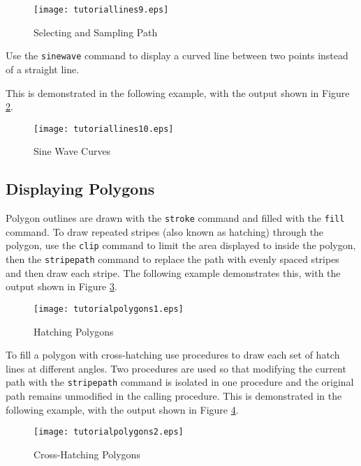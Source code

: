 

\begin{figure}[htb]
\texttt{[image: tutoriallines9.eps]}
\caption{Selecting and Sampling Path}
\label{tutoriallines9}
\end{figure}

Use the \texttt{sinewave} command to display a curved line between
two points instead of a straight line.

This is demonstrated in the following example,
with the output shown in Figure \ref{tutoriallines10}.



\begin{figure}[htb]
\texttt{[image: tutoriallines10.eps]}
\caption{Sine Wave Curves}
\label{tutoriallines10}
\end{figure}

\subsection{Displaying Polygons}

Polygon outlines are drawn with the \texttt{stroke}
command and filled with the \texttt{fill} command.
To draw repeated stripes (also known as hatching) through
the polygon, use the \texttt{clip}
command to limit the area displayed to inside the polygon,
then the \texttt{stripepath}
command to replace the path with evenly spaced stripes and
then draw each stripe.  The following example demonstrates this,
with the output shown in Figure \ref{tutorialpolygons1}.



\begin{figure}[htb]
\texttt{[image: tutorialpolygons1.eps]}
\caption{Hatching Polygons}
\label{tutorialpolygons1}
\end{figure}

To fill a polygon with cross-hatching use procedures to
draw each set of hatch lines at different angles.  Two procedures
are used so that modifying the current path with the
\texttt{stripepath}
command is isolated in one procedure and the original path
remains unmodified in the calling procedure.
This is demonstrated in the following example, with the output
shown in Figure \ref{tutorialpolygons2}.



\begin{figure}[htb]
\texttt{[image: tutorialpolygons2.eps]}
\caption{Cross-Hatching Polygons}
\label{tutorialpolygons2}
\end{figure}

